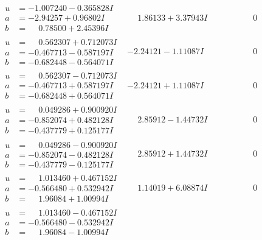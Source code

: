 \documentclass[1p]{elsarticle_modified}
\theoremstyle{definition}
\begin{document}
$$\begin{array}{c|c|c}
\begin{aligned}
u &= -1.007240 - 0.365828 I \\
a &= -2.94257 + 0.96802 I \\
b &= \phantom{-}0.78500 + 2.45396 I\end{aligned}
 & \phantom{-}1.86133 + 3.37943 I & \phantom{-0.000000 } 0 \\ \hline\begin{aligned}
u &= \phantom{-}0.562307 + 0.712073 I \\
a &= -0.467713 - 0.587197 I \\
b &= -0.682448 - 0.564071 I\end{aligned}
 & -2.24121 - 1.11087 I & \phantom{-0.000000 } 0 \\ \hline\begin{aligned}
u &= \phantom{-}0.562307 - 0.712073 I \\
a &= -0.467713 + 0.587197 I \\
b &= -0.682448 + 0.564071 I\end{aligned}
 & -2.24121 + 1.11087 I & \phantom{-0.000000 } 0 \\ \hline\begin{aligned}
u &= \phantom{-}0.049286 + 0.900920 I \\
a &= -0.852074 + 0.482128 I \\
b &= -0.437779 + 0.125177 I\end{aligned}
 & \phantom{-}2.85912 - 1.44732 I & \phantom{-0.000000 } 0 \\ \hline\begin{aligned}
u &= \phantom{-}0.049286 - 0.900920 I \\
a &= -0.852074 - 0.482128 I \\
b &= -0.437779 - 0.125177 I\end{aligned}
 & \phantom{-}2.85912 + 1.44732 I & \phantom{-0.000000 } 0 \\ \hline\begin{aligned}
u &= \phantom{-}1.013460 + 0.467152 I \\
a &= -0.566480 + 0.532942 I \\
b &= \phantom{-}1.96084 + 1.00994 I\end{aligned}
 & \phantom{-}1.14019 + 6.08874 I & \phantom{-0.000000 } 0 \\ \hline\begin{aligned}
u &= \phantom{-}1.013460 - 0.467152 I \\
a &= -0.566480 - 0.532942 I \\
b &= \phantom{-}1.96084 - 1.00994 I\end{aligned}

\end{array}$$
\end{document}
